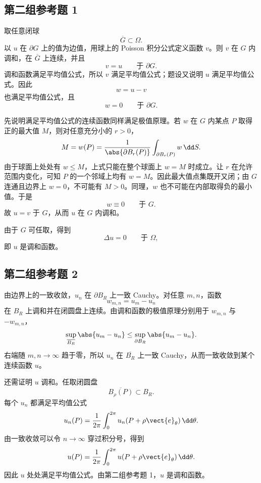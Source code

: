\subsection*{第二组参考题 1}
\begin{xsolution}
取任意闭球
\[
  \overline{G}\subset\Omega.
\]
以 $u$ 在 $\partial G$ 上的值为边值，用球上的 Poisson 积分公式定义函数 $v$。则 $v$ 在 $G$ 内调和，在 $\overline G$ 上连续，并且
\[
  v=u\qquad\text{于 }\partial G.
\]
调和函数满足平均值公式，所以 $v$ 满足平均值公式；题设又说明 $u$ 满足平均值公式。因此
\[
  w=u-v
\]
也满足平均值公式，且
\[
  w=0\qquad\text{于 }\partial G.
\]

先说明满足平均值公式的连续函数同样满足极值原理。若 $w$ 在 $G$ 内某点 $P$ 取得正的最大值 $M$，则对任意充分小的 $r>0$，
\[
  M=w(P)=\frac{1}{\abs{\partial B_r(P)}}
  \int_{\partial B_r(P)}w\,\dd S.
\]
由于球面上处处有 $w\le M$，上式只能在整个球面上 $w=M$ 时成立。让 $r$ 在允许范围内变化，可知 $P$ 的一个邻域上均有 $w=M$。因此最大值点集既开又闭；由 $G$ 连通且边界上 $w=0$，不可能有 $M>0$。同理，$w$ 也不可能在内部取得负的最小值。于是
\[
  w\equiv0\qquad\text{于 }G.
\]
故 $u=v$ 于 $G$，从而 $u$ 在 $G$ 内调和。

由于 $G$ 可任取，得到
\[
  \Delta u=0\qquad\text{于 }\Omega,
\]
即 $u$ 是调和函数。
\end{xsolution}

\subsection*{第二组参考题 2}
\begin{xsolution}
由边界上的一致收敛，$u_n$ 在 $\partial B_R$ 上一致 Cauchy。对任意 $m,n$，函数
\[
  w_{m,n}=u_m-u_n
\]
在 $B_R$ 上调和并在闭圆盘上连续。由调和函数的极值原理分别用于 $w_{m,n}$ 与 $-w_{m,n}$，
\[
  \sup_{\overline{B_R}}\abs{u_m-u_n}
  \le\sup_{\partial B_R}\abs{u_m-u_n}.
\]
右端随 $m,n\to\infty$ 趋于零，所以 $u_n$ 在 $\overline{B_R}$ 上一致 Cauchy，从而一致收敛到某个连续函数 $u$。

还需证明 $u$ 调和。任取闭圆盘
\[
  \overline{B_\rho(P)}\subset B_R.
\]
每个 $u_n$ 都满足平均值公式
\[
  u_n(P)=\frac{1}{2\pi}\int_0^{2\pi}u_n(P+\rho\vect{e}_\theta)\,\dd\theta.
\]
由一致收敛可以令 $n\to\infty$ 穿过积分号，得到
\[
  u(P)=\frac{1}{2\pi}\int_0^{2\pi}u(P+\rho\vect{e}_\theta)\,\dd\theta.
\]
因此 $u$ 处处满足平均值公式。由第二组参考题 1，$u$ 是调和函数。
\end{xsolution}


